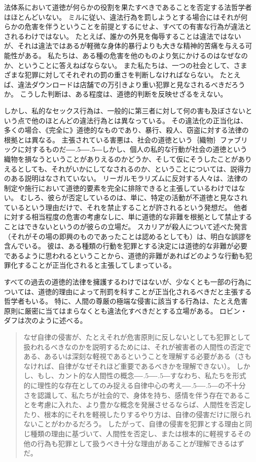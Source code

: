 \documentclass[paper=a4,book,openany]{jlreq}
\def\DDASH{―\kern-.5\zw―\kern-.5\zw―} %
\begin{document}
法体系において道徳が何らかの役割を果たすべきであることを否定する法哲学者はほとんどいない。
ミルに従い、違法行為を罰しようとする場合にはそれが何らかの危害を伴うということを前提とするにせよ、すべての有害な行為が違法とされるわけではない。
たとえば、誰かの外見を侮辱することは違法ではないが、それは違法ではあるが軽微な身体的暴行よりも大きな精神的苦痛を与える可能性がある。
私たちは、ある種の危害を他のものより気にかけるのはなぜなのか、ということに答えねばならない。
また私たちは、一つの社会として、さまざまな犯罪に対してそれぞれの罰の重さを判断しなければならない。
たとえば、違法ダウンロードは店舗での万引きより重い犯罪と見なされるべきだろうか。
こうした判断は、ある程度は、道徳的判断を反映せざるをえない。

しかし、私的なセックス行為は、一般的に第三者に対して何の害も及ぼさないという点で他のほとんどの違法行為とは異なっている。
その違法化の正当化は、多くの場合、《完全に》道徳的なものであり、暴行、殺人、窃盗に対する法律の根拠とは異なる。
主張されている害悪は、社会の道徳という｛織物｝{ファブリック}に対するものだ{\DDASH}しかし、個人の私的な行動が社会の道徳という織物を損なうということがありえるのかどうか、そして仮にそうしたことがありえるとしても、それがいかにしてなされるのか、ということについては、説得力のある説明はなされていない。
リーガルモラリズムに反対する人々は、法律の制定や施行において道徳的要素を完全に排除できると主張しているわけではない。
むしろ、彼らが否定しているのは、単に、特定の活動が不道徳と見なされているという理由だけで、それを禁止することが許されるという発想だ。
他者に対する相当程度の危害の考慮なしに、単に道徳的な非難を根拠として禁止することはできないというのが彼らの立場だ。
スカリアが殺人について述べた発言（それがその場の即興のものであったことは認めるとしても）は、明白な誤謬を含んでいる。
彼は、ある種類の行動を犯罪とする決定には道徳的な非難が必要であるように思われるということから、道徳的非難があればどのような行動も犯罪化することが正当化されると主張してしまっている。

すべての過去の道徳的法律を擁護するわけではないが、少なくとも一部の行為については、道徳的理由によって刑罰を科すことが正当化されるべきだと主張する哲学者もいる。
特に、人間の尊厳の極端な侵害に該当する行為は、たとえ危害原則に厳密に当てはまらなくとも違法化すべきだとする立場がある。
ロビン・ダフは次のように述べる。

\begin{quote}
なぜ自律の侵害が、たとえそれが危害原則に反しないとしても犯罪として扱われるべきなのかを説明するためには、それが被害者の人間性の否定である、あるいは深刻な軽視であるということを理解する必要がある（さもなければ、自律がなぜそれほど重要であるべきかを理解できない）。
しかし、もし、カント的な人間性の概念{\DDASH}すなわち、私たちを形式的に理性的な存在としてのみ捉える自律中心の考え{\DDASH}の不十分さを認識して、私たちが社会的で、身体を持ち、感情を伴う存在であることを考慮に入れた、より豊かな概念を発展させるならば、人間性を否定したり、根本的にそれを軽視したりするやり方は、自律の侵害だけに限られないことがわかるだろう。
したがって、自律の侵害を犯罪とする理由と同じ種類の理由に基づいて、人間性を否定し、または根本的に軽視するその他の行為も犯罪として扱うべき十分な理由があることが理解できるはずだ。
\citep[p.43]{duff01:_harms_wrong}
\end{quote}
\end{document}
